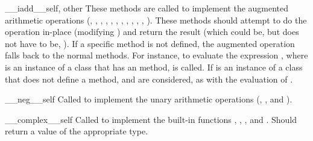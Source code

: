 \begin{methoddesc}{__iadd__}{self, other}
These methods are called to implement the augmented arithmetic
operations (\code{+=}, \code{-=}, \code{*=}, \code{/=}, \code{//=},
\code{\%=}, \code{**=}, \code{<<=}, \code{>>=}, \code{\&=},
\code{\textasciicircum=}, \code{|=}).  These methods should attempt to do the
operation in-place (modifying ) and return the result (which
could be, but does not have to be, ).  If a specific method
is not defined, the augmented operation falls back to the normal
methods.  For instance, to evaluate the expression
\code{+=}, where  is an instance of a class that
has an  method,  is
called.  If  is an instance of a class that does not define a
 method,  and
 are considered, as with the
evaluation of \code{+}.
\end{methoddesc}

\begin{methoddesc}{__neg__}{self}
Called to implement the unary arithmetic operations (\code{-},
\code{+},  and \code{\~{}}).
\end{methoddesc}

\begin{methoddesc}{__complex__}{self}
Called to implement the built-in functions
,
, ,
and .  Should return a value of
the appropriate type.
\end{methoddesc}

